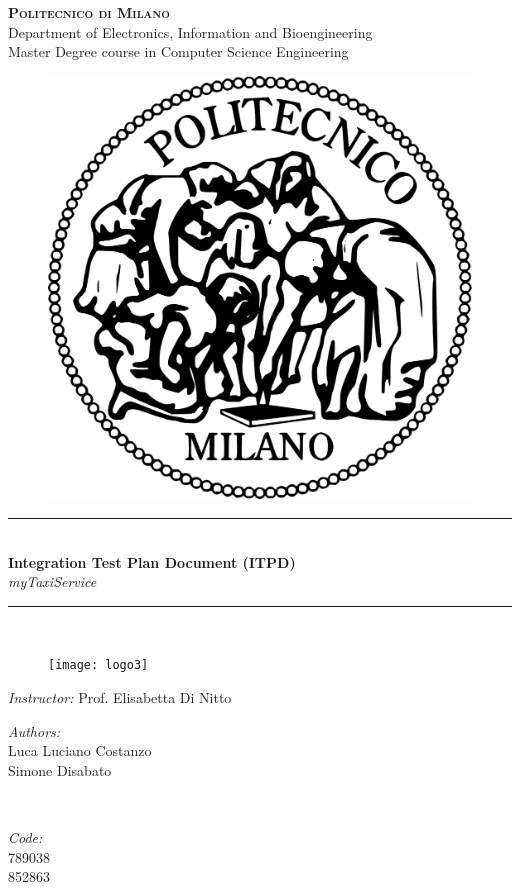 \documentclass[12pt]{report}
\begin{document}
\pagestyle{empty}

\cleardoublepage


\begin{titlepage}

\newcommand{\HRule}{\rule{\linewidth}{0.5mm}} %

\center %

\textsc{\huge \bf{Politecnico di Milano}}\\[0.5cm]
\textsf{\Large Department of Electronics, Information and Bioengineering}\\[0.25cm] %
\textsf{\large Master Degree course in Computer Science Engineering}\\[0.5cm] %

\begin{figure}[h]
	\centering
	\includegraphics[width = 3 cm]{Figures/PoliMi}
\end{figure}


\HRule \\

\LARGE \textbf {Integration Test Plan Document (ITPD)} \\[0.2cm]
\large \textit {myTaxiService}
\\ %
\HRule \\

\begin{figure}[h]
	\center
	\texttt{[image: logo3]}
\end{figure}

\begin{flushleft}
	\large \textit{Instructor:} Prof. Elisabetta Di Nitto \\[0.5cm]

	\begin{minipage}{0.45\textwidth}
	\begin{flushleft} \large
	\emph{Authors:}\\
	Luca Luciano Costanzo\\
	Simone Disabato
	\end{flushleft}
	\end{minipage}
	~
	\begin{minipage}{0.45\textwidth}
	\begin{flushright} \large
	\emph{Code:} \\
	789038\\
	852863
	\end{flushright}
	\end{minipage} \\[1cm]


\end{flushleft}
\end{titlepage}
\end{document}
